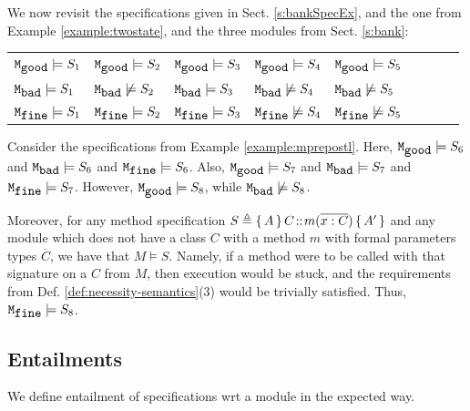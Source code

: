 {{%
 \begin{example}
 \label{example:twostatesarisfy}
 {We now revisit the specifications given in Sect. \ref{s:bankSpecEx}, and the one from Example \ref{example:twostate}, and  the three  modules from Sect. \ref{s:bank}:}


\begin{tabular}{lllllllll}
$\ModA  \models S_1$  &   $\ModA  \models S_2$ &  $\ModA \models S_3$ &   $\ModA \models S_4$    & $\ModA \models S_5$\\
 $\ModB \models S_1$  &   $\ModB \not\models S_2$   &  $\ModB  \models S_3$   &  $\ModB  \not\models S_4$   & $\ModB \not\models S_5$ \\
 $\ModC  \models S_1$    & $\ModC \models S_2$ &   $\ModC \models S_3$    &$\ModC \not\models S_4$   & $\ModC \not\models S_5$ 
\end{tabular}
\end{example}
 

 {
 \begin{example}
 \label{example:mprepostlsatissy}
 Consider  the %
  specifications   from Example \ref{example:mprepostl}.
Here, $\ModA \models S_6$ and $\ModB \models S_6$ and  $\ModC \models S_6$.
Also,  $\ModA \models S_7$ and $\ModB \models S_7$ and  $\ModC \models S_7$.
However,   $\ModA  \models S_8$, while $\ModB  \not\models S_8$.

Moreover,  for any method specification  $S \triangleq {\mprepost{A}{C}{m}{x}{C}{A'} }$ and any module   which does not have a class $C$  with a method $m$ with formal parameters types ${\overline C}$, we have that $M \models S$.
Namely, if a method were to be called with that signature on a $C$  from $M$, then execution would be stuck, and the requirements from Def. \ref{def:necessity-semantics}(3) would be trivially satisfied.
Thus,   $\ModC \models S_8$. %

\end{example}
}
 
 
\subsection{\SpecLang Entailments}

{We define entailment of specifications wrt a module in the expected way.} %

}}
